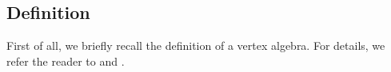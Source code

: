 




\subsection{Definition}

First of all,
we briefly recall the definition of a vertex algebra.
For details, we refer the reader to
\cite{frenkel-ben-zvi} and \cite{kac}.

